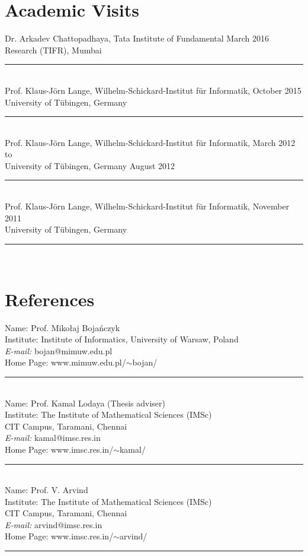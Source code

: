 \documentclass[margin]{res}
\begin{document}
\begin{resume}
\section{Academic Visits}
Dr. Arkadev Chattopadhaya, Tata Institute of Fundamental \hfill March 2016 \\
 Research (TIFR), Mumbai \\
 					\noindent\rule{13cm}{0.4pt} \\
Prof. Klaus-J\"orn Lange, Wilhelm-Schickard-Institut f\"ur Informatik, \hfill October 2015\\
					University of T\"ubingen, Germany \\							
					\noindent\rule{13cm}{0.4pt} \\
Prof. Klaus-J\"orn Lange, Wilhelm-Schickard-Institut f\"ur Informatik, \hfill March 2012 to\\
					University of T\"ubingen, Germany \hfill August 2012 \\
					\noindent\rule{13cm}{0.4pt} \\
Prof. Klaus-J\"orn Lange, Wilhelm-Schickard-Institut f\"ur Informatik, \hfill November 2011\\
					University of T\"ubingen, Germany \\					
					\noindent\rule{13cm}{0.4pt} \\

\section{References}
			Name: 		Prof.  Miko\l{}aj Boja\'nczyk \\
			Institute: 	Institute of Informatics, University of Warsaw, Poland\\
			\emph{E-mail:} {bojan@mimuw.edu.pl} \\
			Home Page: www.mimuw.edu.pl/$\sim$bojan/\\
			\noindent\rule{13cm}{0.4pt} \\					
			Name: 		Prof. Kamal Lodaya (Thesis adviser) \\
			Institute: 	The Institute of Mathematical Sciences (IMSc) \\
			CIT Campus, Taramani, Chennai	\\
			\emph{E-mail:} {kamal@imsc.res.in} \\
			Home Page: www.imsc.res.in/$\sim$kamal/ \\
			\noindent\rule{13cm}{0.4pt} \\					
			Name: 		Prof. V. Arvind \\
			Institute: 	The Institute of Mathematical Sciences (IMSc) \\
			CIT Campus, Taramani, Chennai	\\
			\emph{E-mail:} {arvind@imsc.res.in} \\
			Home Page: www.imsc.res.in/$\sim$arvind/ \\
			\noindent\rule{13cm}{0.4pt}	
			
\end{resume}
\end{document}
